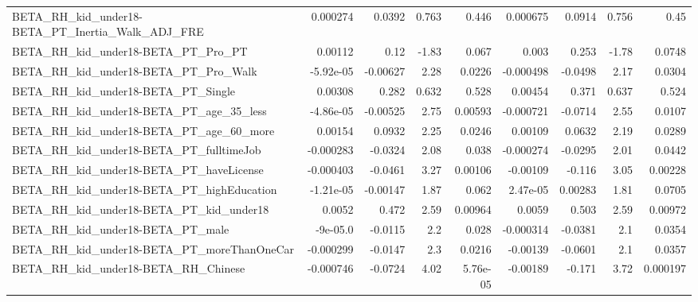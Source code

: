 \begin{tabular}{lrrrrrrrr}
BETA\_RH\_kid\_under18-BETA\_PT\_Inertia\_Walk\_ADJ\_FRE   &    0.000274 &       0.0392 &    0.763 &    0.446 &   0.000675 &      0.0914 &        0.756 &          0.45 \\
BETA\_RH\_kid\_under18-BETA\_PT\_Pro\_PT                 &     0.00112 &         0.12 &    -1.83 &    0.067 &      0.003 &       0.253 &        -1.78 &        0.0748 \\
BETA\_RH\_kid\_under18-BETA\_PT\_Pro\_Walk               &   -5.92e-05 &     -0.00627 &     2.28 &   0.0226 &  -0.000498 &     -0.0498 &         2.17 &        0.0304 \\
BETA\_RH\_kid\_under18-BETA\_PT\_Single                 &     0.00308 &        0.282 &    0.632 &    0.528 &    0.00454 &       0.371 &        0.637 &         0.524 \\
BETA\_RH\_kid\_under18-BETA\_PT\_age\_35\_less            &   -4.86e-05 &     -0.00525 &     2.75 &  0.00593 &  -0.000721 &     -0.0714 &         2.55 &        0.0107 \\
BETA\_RH\_kid\_under18-BETA\_PT\_age\_60\_more            &     0.00154 &       0.0932 &     2.25 &   0.0246 &    0.00109 &      0.0632 &         2.19 &        0.0289 \\
BETA\_RH\_kid\_under18-BETA\_PT\_fulltimeJob            &   -0.000283 &      -0.0324 &     2.08 &    0.038 &  -0.000274 &     -0.0295 &         2.01 &        0.0442 \\
BETA\_RH\_kid\_under18-BETA\_PT\_haveLicense            &   -0.000403 &      -0.0461 &     3.27 &  0.00106 &   -0.00109 &      -0.116 &         3.05 &       0.00228 \\
BETA\_RH\_kid\_under18-BETA\_PT\_highEducation          &   -1.21e-05 &     -0.00147 &     1.87 &    0.062 &   2.47e-05 &     0.00283 &         1.81 &        0.0705 \\
BETA\_RH\_kid\_under18-BETA\_PT\_kid\_under18            &      0.0052 &        0.472 &     2.59 &  0.00964 &     0.0059 &       0.503 &         2.59 &       0.00972 \\
BETA\_RH\_kid\_under18-BETA\_PT\_male                   &    -9e-05.0 &      -0.0115 &      2.2 &    0.028 &  -0.000314 &     -0.0381 &          2.1 &        0.0354 \\
BETA\_RH\_kid\_under18-BETA\_PT\_moreThanOneCar         &   -0.000299 &      -0.0147 &      2.3 &   0.0216 &   -0.00139 &     -0.0601 &          2.1 &        0.0357 \\
BETA\_RH\_kid\_under18-BETA\_RH\_Chinese                &   -0.000746 &      -0.0724 &     4.02 & 5.76e-05 &   -0.00189 &      -0.171 &         3.72 &      0.000197 \\

\end{tabular}
